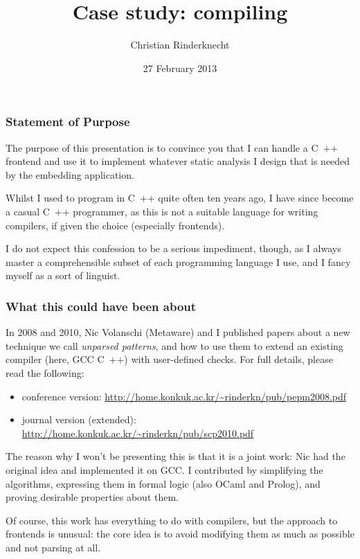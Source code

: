 \documentclass[compress,dvips,xcolor={dvipsnames},t]{beamer}
\title{Case study: compiling \ASN}
\author{Christian Rinderknecht}
\date{27 February 2013}
\newcommand\Cpp{\mbox{\textsf{C} \hspace*{-2.5mm} \raise 0.7mm \hbox 
{${\scriptscriptstyle \textsf{++}}$}}\xspace}
\begin{document}
\frame{\maketitle}

\begin{frame}
\frametitle{Statement of Purpose}

The purpose of this presentation is to convince you that I can handle
a \Cpp frontend and use it to implement whatever static analysis I
design that is needed by the embedding application.

\bigskip

Whilst I used to program in \Cpp quite often ten years ago, I have
since become a casual \Cpp programmer, as this is not a suitable
language for writing compilers, if given the choice (especially
frontends).

\bigskip

I do not expect this confession to be a serious impediment, though, as
I always master a comprehensible subset of each programming language I
use, and I fancy myself as a sort of linguist.

\end{frame}


\begin{frame}
\frametitle{What this could have been about}

In 2008 and 2010, Nic Volanschi (Metaware) and I published papers
about a new technique we call \emph{unparsed patterns}, and how to use
them to extend an existing compiler (here, GCC \Cpp) with user-defined
checks. For full details, please read the following:
\begin{itemize}

  \item conference version: {\small\url{http://home.konkuk.ac.kr/~rinderkn/pub/pepm2008.pdf}}

  \item journal version (extended): {\small\url{http://home.konkuk.ac.kr/~rinderkn/pub/scp2010.pdf}}

\end{itemize}
The reason why I won't be presenting this is that it is a joint work:
Nic had the original idea and implemented it on GCC. I contributed by
simplifying the algorithms, expressing them in formal logic (also
OCaml and Prolog), and proving desirable properties about them.

\medskip

Of course, this work has everything to do with compilers, but the
approach to frontends is unusual: the core idea is to avoid modifying
them as much as possible and not parsing at all.

\end{frame}
\end{document}
